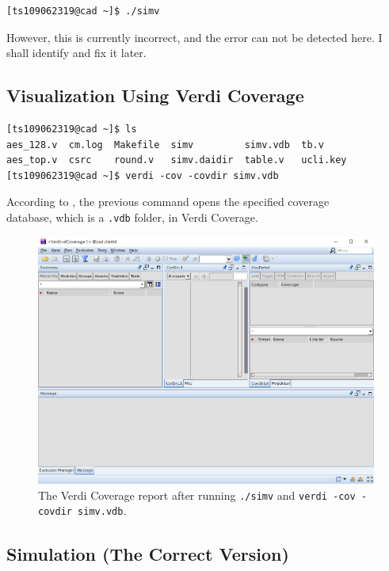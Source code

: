 \documentclass{article}
\begin{document}
\begin{verbatim}
[ts109062319@cad ~]$ ./simv
\end{verbatim}

However, this is currently incorrect, and the error can not be detected here. I shall identify and fix it later.

\subsection{Visualization Using Verdi Coverage}

\begin{verbatim}
[ts109062319@cad ~]$ ls
aes_128.v  cm.log  Makefile  simv         simv.vdb  tb.v
aes_top.v  csrc    round.v   simv.daidir  table.v   ucli.key
[ts109062319@cad ~]$ verdi -cov -covdir simv.vdb
\end{verbatim}

According to \cite{ytverdicov}, the previous command opens the specified coverage\\database, which is a \verb|.vdb| folder, in Verdi Coverage.

\begin{figure}[h] \centering
\includegraphics[width=\textwidth]{simv_no_cm}
\caption{The Verdi Coverage report after running \texttt{./simv} and \texttt{verdi -cov -covdir simv.vdb}.}
\label{simv_no_cm}
\end{figure}

\subsection{Simulation (The Correct Version)}
\end{document}
